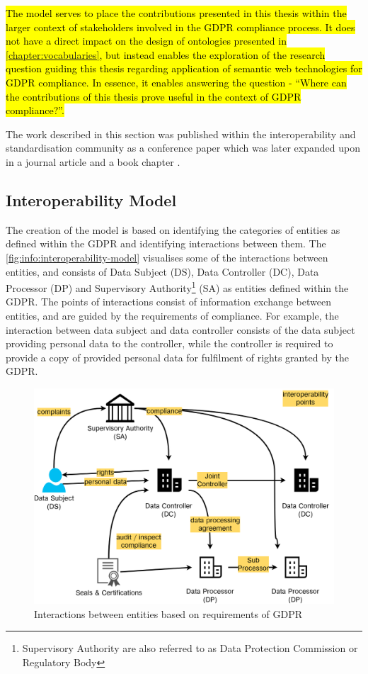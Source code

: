 \hl{The model serves to place the contributions presented in this thesis within the larger context of stakeholders involved in the GDPR compliance process. It does not have a direct impact on the design of ontologies presented in \autoref{chapter:vocabularies}, but instead enables the exploration of the research question guiding this thesis regarding application of semantic web technologies for GDPR compliance.
In essence, it enables answering the question - ``Where can the contributions of this thesis prove useful in the context of GDPR compliance?''.}

The work described in this section was published within the interoperability and standardisation community as a conference paper
\cite{pandit_gdpr_2018} which was later expanded upon in a journal article \cite{pandit_exploration_2018} and a book chapter \cite{pandit_standardisation_2020}.

\subsection*{Interoperability Model}
The creation of the model is based on identifying the categories of entities as defined within the GDPR and identifying interactions between them.
The \autoref{fig:info:interoperability-model} visualises some of the interactions between entities, and consists of Data Subject (DS), Data Controller (DC), Data Processor (DP) and Supervisory Authority\footnote{Supervisory Authority are also referred to as Data Protection Commission or Regulatory Body} (SA) as entities defined within the GDPR.
The points of interactions consist of information exchange between entities, and are guided by the requirements of compliance. For example, the interaction between data subject and data controller consists of the data subject providing personal data to the controller, while the controller is required to provide a copy of provided personal data for fulfilment of rights granted by the GDPR.
\begin{figure}[htbp]
    \centering
    \includegraphics[width=0.75\linewidth]{img/interoperability-model.png}
    \caption{Interactions between entities based on requirements of GDPR \cite{pandit_exploration_2018}}
    \label{fig:info:interoperability-model}
\end{figure}


